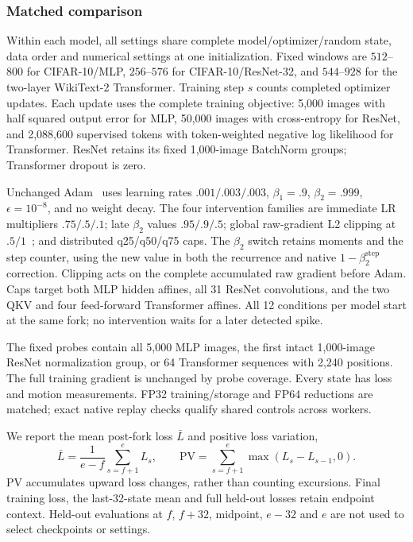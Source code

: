 \subsubsection{Matched comparison}
Within each model, all settings share complete model/optimizer/random state,
data order and numerical settings at one initialization. Fixed windows are
$512$--$800$ for CIFAR-10/MLP,
$256$--$576$ for CIFAR-10/ResNet-32, and $544$--$928$ for the two-layer
WikiText-2 Transformer. Training step $s$ counts completed optimizer updates.
Each update uses the complete training objective: 5,000 images with half squared
output error for MLP, 50,000 images with cross-entropy for ResNet, and 2,088,600
supervised tokens with token-weighted negative log likelihood for Transformer.
ResNet retains its fixed 1,000-image BatchNorm groups; Transformer dropout is zero.

Unchanged Adam~\cite{kingma2014adam} uses learning rates $.001/.003/.003$,
$\beta_1=.9$, $\beta_2=.999$, $\epsilon=10^{-8}$, and no weight decay.
The four intervention families are immediate LR multipliers $.75/.5/.1$;
late $\beta_2$ values $.95/.9/.5$; global raw-gradient L2 clipping at
$.5/1$~\cite{pascanu2013difficulty}; and distributed q25/q50/q75 caps.
The $\beta_2$ switch retains moments and the step counter, using the new value
in both the recurrence and native $1-\beta_2^{\mathrm{step}}$ correction.
Clipping acts on the complete accumulated raw gradient before Adam.
Caps target both MLP hidden affines, all 31 ResNet convolutions, and the two
QKV and four feed-forward Transformer affines. All 12 conditions per model
start at the same fork; no intervention waits for a later detected spike.

The fixed probes contain all 5,000 MLP images, the first intact 1,000-image
ResNet normalization group, or 64 Transformer sequences with 2,240 positions.
The full training gradient is unchanged by probe coverage. Every state has loss
and motion measurements. FP32 training/storage and FP64 reductions are matched;
exact native replay checks qualify shared controls across workers.

We report the mean post-fork loss $\bar L$ and positive loss variation,
\begin{equation}
 \bar L=\frac{1}{e-f}\sum_{s=f+1}^{e}L_s,\qquad
 \mathrm{PV}=\sum_{s=f+1}^{e}\max(L_s-L_{s-1},0).
 \label{eq:vc-outcomes}
\end{equation}
PV accumulates upward loss changes, rather than counting excursions.
Final training loss, the last-32-state mean and full held-out losses retain
endpoint context. Held-out evaluations at $f$, $f+32$, midpoint, $e-32$ and $e$
are not used to select checkpoints or settings.

